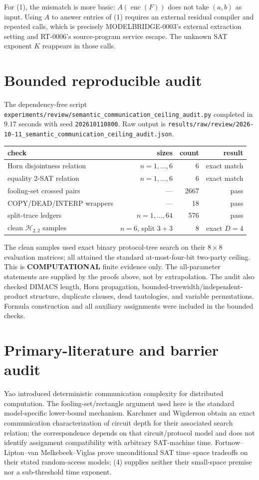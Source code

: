 \documentclass[11pt]{article}
\newcommand{\enc}{\operatorname{enc}}
\begin{document}
For (1), the mismatch is more basic: $A(\enc(F))$ does not take $(a,b)$ as
input.  Using $A$ to answer entries of (1) requires an external residual
compiler and repeated calls, which is precisely MODELBRIDGE-0003's external
extraction setting and RT-0006's source-program service escape.  The unknown
SAT exponent $K$ reappears in those calls.

\section{Bounded reproducible audit}
The dependency-free script
\texttt{experiments/review/semantic\_communication\_ceiling\_audit.py}
completed in $9.17$ seconds with seed \texttt{202610110800}.  Raw output is
\texttt{results/raw/review/2026-10-11\_semantic\_communication\_ceiling\_audit.json}.

\begin{center}
\begin{tabular}{@{}lrrr@{}}
\toprule
check & sizes & count & result\\
\midrule
Horn disjointness relation & $n=1,\ldots,6$ & 6 & exact match\\
equality 2-SAT relation & $n=1,\ldots,6$ & 6 & exact match\\
fooling-set crossed pairs & --- & 2667 & pass\\
COPY/DEAD/INTERP wrappers & --- & 18 & pass\\
split-trace ledgers & $n=1,\ldots,64$ & 576 & pass\\
clean $\mathcal H_{2,2}$ samples & $n=6$, split $3+3$ & 8 & exact $D=4$\\
\bottomrule
\end{tabular}
\end{center}
The clean samples used exact binary protocol-tree search on their $8\times8$
evaluation matrices; all attained the standard at-most-four-bit two-party
ceiling.  This is \textbf{COMPUTATIONAL} finite evidence only.  The
all-parameter statements are supplied by the proofs above, not by
extrapolation.  The audit also checked DIMACS length, Horn propagation,
bounded-treewidth/independent-product structure, duplicate clauses, dead
tautologies, and variable permutations.  Formula construction and all
auxiliary assignments were included in the bounded checks.

\section{Primary-literature and barrier audit}
Yao introduced deterministic communication complexity for distributed
computation.  The fooling-set/rectangle argument used here is the standard
model-specific lower-bound mechanism.  Karchmer and Wigderson obtain an exact
communication characterization of circuit depth for their associated search
relation; the correspondence depends on that circuit/protocol model and does
not identify assignment compatibility with arbitrary SAT-machine time.
Fortnow--Lipton--van Melkebeek--Viglas prove unconditional SAT time--space
tradeoffs on their stated random-access models; (4) supplies neither their
small-space premise nor a sub-threshold time exponent.
\end{document}
